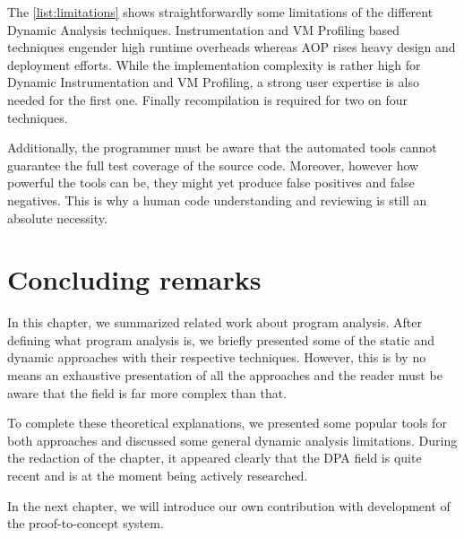 The \autoref{list:limitations} shows straightforwardly some limitations of the different Dynamic Analysis techniques. Instrumentation and VM Profiling based techniques engender high runtime overheads whereas AOP rises heavy design and deployment efforts. While the implementation complexity is rather high for Dynamic Instrumentation and VM Profiling, a strong user expertise is also needed for the first one. Finally recompilation is required for two on four techniques.

Additionally, the programmer must be aware that the automated tools cannot guarantee the full test coverage of the source code. Moreover, however how powerful the tools can be, they might yet produce false positives and false negatives. This is why a human code understanding and reviewing is still an absolute necessity.

\section{Concluding remarks}

In this chapter, we summarized related work about program analysis. After defining what program analysis is, we briefly presented some of the static and dynamic approaches with their respective techniques. However, this is by no means an exhaustive presentation of all the approaches and the reader must be aware that the field is far more complex than that. 

To complete these theoretical explanations, we presented some popular tools for both approaches and discussed some general dynamic analysis limitations. During the redaction of the chapter, it appeared clearly that the DPA field is quite recent and is at the moment being actively researched. 

In the next chapter, we will introduce our own contribution with  development of the proof-to-concept system.
